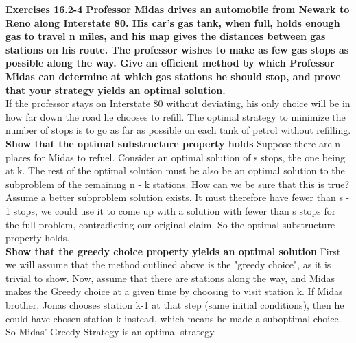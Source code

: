 \documentclass[10pt,fullpage]{article}
\begin{document}
\newpage

\textbf{Exercises 16.2-4 Professor Midas drives an automobile from
Newark to Reno along Interstate 80. His car's gas tank, when full,
holds enough gas to travel n miles, and his map gives the
distances between gas stations on his route. The professor wishes
to make as few gas stops as possible along the way. Give an
efficient method by which Professor Midas can determine at which
gas stations he should stop, and prove that your strategy yields
an optimal solution. }\\

If the professor stays on Interstate 80 without deviating, his
only choice will be in how far down the road he chooses to refill.
The optimal strategy to minimize the number of stops is to go as
far as possible on each tank of petrol without refilling.\\

\textbf{Show that the optimal substructure property holds} Suppose
there are n places for Midas to refuel. Consider an optimal
solution of s stops, the one being at k. The rest of the optimal
solution must be also be an optimal solution to the subproblem of
the remaining n - k stations. How can we be sure that this is
true? Assume a better subproblem solution exists. It must
therefore have fewer than s - 1 stops, we could use it to come up
with a solution with fewer than s stops for the full problem,
contradicting our original claim. So the optimal substructure
property holds.\\

\textbf{Show that the greedy choice property yields an optimal
solution} First we will assume that the method outlined above is
the "greedy choice", as it is trivial to show. Now, assume that
there are stations along the way, and Midas makes the Greedy
choice at a given time by choosing to visit station k. If Midas
brother, Jonas chooses station k-1 at that step (same initial
conditions), then he could have chosen station k instead, which
means he made a suboptimal choice. So Midas' Greedy Strategy is an
optimal strategy.
\end{document}
